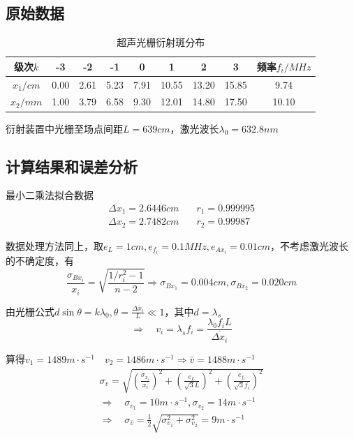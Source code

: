 \documentclass[12pt, a4paper]{ctexart}
\begin{document}
\subsection{原始数据}

\begin{table}[htbp]
  \centering
  \caption{超声光栅衍射斑分布}
    \begin{tabular}{cccccccc|c}
    \toprule
    级次$k$  & -3    & -2    & -1    & 0     & 1     & 2     & 3     & 频率$f_i/MHz$ \\
    \midrule
    $x_1/cm$ & 0.00     & 2.61  & 5.23  & 7.91  & 10.55 & 13.20 & 15.85 & 9.74 \\
    $x_2/mm$ & 1.00     & 3.79  & 6.58  & 9.30  & 12.01 & 14.80 & 17.50 & 10.10 \\
    \bottomrule
    \end{tabular}
  \label{tab:t6}
\end{table}
衍射装置中光栅至场点间距$L = 639cm$，激光波长$\lambda_0 = 632.8nm$

\subsection{计算结果和误差分析}

最小二乘法拟合数据
\begin{align*}
    \Delta x_1 = 2.6446cm &\quad r_1 = 0.999995\\
    \Delta x_2 = 2.7482cm &\quad r_2 = 0.99987
\end{align*}

数据处理方法同上，取$e_L = 1cm,e_{f_i} = 0.1MHz,e_{Ax_{i}} = 0.01cm$，不考虑激光波长的不确定度，有
\[
  \frac{\sigma_{Bx_i}}{x_i} = \sqrt{\frac{1/r_i^2 - 1}{n - 2}} \Rightarrow \sigma_{Bx_1} = 0.004cm , \sigma_{Bx_2} = 0.020cm
\]

由光栅公式$d\sin{\theta} = k\lambda_0 , \theta = \frac{\Delta x_i}{L} \ll 1$，其中$d = \lambda_s$
\[
  \Rightarrow \quad v_i = \lambda_s f_i = \frac{\lambda_0 f_i L}{\overline{\Delta x_i}}
\]

算得$v_1 = 1489 m \cdot s^{-1} \quad v_2 = 1486 m \cdot s^{-1} \Rightarrow \bar{v} = 1488 m \cdot s^{-1}$
\begin{gather*}
  \sigma_v = \sqrt{(\frac{\sigma_{x_i}}{x_i})^2 + (\frac{e_L}{\sqrt3 L})^2 + (\frac{e_{f_i}}{\sqrt3 f_i})^2}\\
  \Rightarrow \quad \sigma_{v_1} = 10 m \cdot s^{-1} , \sigma_{v_2} = 14 m \cdot s^{-1}\\
  \Rightarrow \quad \sigma_{\bar{v}} = \frac{1}{2} \sqrt{\sigma_{v_1}^2 + \sigma_{v_2}^2} = 9m \cdot s^{-1}
\end{gather*}
\end{document}
